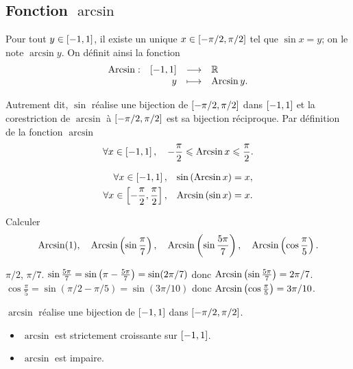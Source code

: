 \documentclass{magnolia}
\begin{document}
\subsection{Fonction $\arcsin$}

\begin{definition}[utile=-3]
Pour tout $y\in\left[-1,1\right]$, il existe un unique $x\in\left[-\pi/2,\pi/2\right]$
tel que $\sin x=y$; on le note $\arcsin y$. On définit ainsi la fonction
\[\begin{array}[t]{lrcl} \displaystyle{\operatorname{Arcsin}} : & \displaystyle{\left[-1,1\right]} & \longrightarrow & \displaystyle{\mathbb{R}} \\ & \displaystyle{y} & \longmapsto & \displaystyle{\operatorname{Arcsin}y .} \end{array}\]
\end{definition}

\begin{remarques}
\remarque Autrement dit, $\sin$ réalise une bijection de $\left[-\pi/2,\pi/2\right]$ dans $\left[-1,1\right]$ et la corestriction de $\arcsin$ à $\left[-\pi/2,\pi/2\right]$ est sa bijection réciproque.
\remarque Par définition de la fonction $\arcsin$
  \[\forall x\in\left[-1,1\right] ,\quad -\frac{\pi}{2}\leqslant\operatorname{Arcsin} x
    \leqslant\frac{\pi}{2}.\]
\end{remarques}

\begin{proposition}[utile=-3]
\begin{eqnarray*}
\forall x\in\left[-1,1\right], & & \sin\left(\operatorname{Arcsin} x\right)=x,\\
\forall x\in\left[-\frac{\pi}{2},\frac{\pi}{2}\right], & &
  \operatorname{Arcsin}\left(\sin x\right)=x .    
\end{eqnarray*}
\end{proposition}

\begin{exoUnique}
\exemple Calculer
  \[\operatorname{Arcsin}(1), \quad \operatorname{Arcsin}\left(\sin\frac{\pi}{7}\right), \quad
    \operatorname{Arcsin}\left(\sin\frac{5\pi}{7}\right), \quad \operatorname{Arcsin}\left(\cos\frac{\pi}{5}\right).\]
\end{exoUnique}

\begin{sol}
$\pi/2$, $\pi/7$.
$\sin\frac{5\pi}{7}=\sin\left(\pi-\frac{5\pi}{7}\right)=\sin(2\pi/7)$ donc $\operatorname{Arcsin}\left(\sin\frac{5\pi}{7}\right)=2\pi/7$.
$\cos\frac{\pi}{5}=\sin(\pi/2-\pi/5)=\sin(3\pi/10)$ donc $\operatorname{Arcsin}\left(\cos\frac{\pi}{5}\right)=3\pi/10$.


\end{sol}

\begin{proposition}[utile=-3]
$\arcsin$ réalise une bijection de $\left[-1,1\right]$ dans $\left[-\pi/2,\pi/2\right]$.
\end{proposition}

\begin{proposition}[utile=-3]
\begin{itemize}
\item $\arcsin$ est strictement croissante sur $\left[-1,1\right]$.
\item $\arcsin$ est impaire.
\end{itemize}
\end{proposition}
\end{document}
